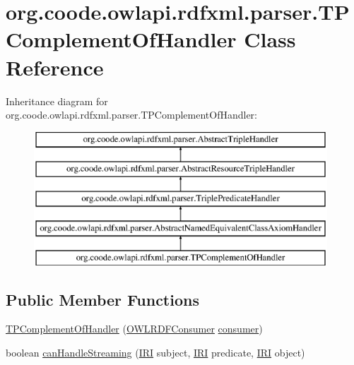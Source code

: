 \hypertarget{classorg_1_1coode_1_1owlapi_1_1rdfxml_1_1parser_1_1_t_p_complement_of_handler}{\section{org.\-coode.\-owlapi.\-rdfxml.\-parser.\-T\-P\-Complement\-Of\-Handler Class Reference}
\label{classorg_1_1coode_1_1owlapi_1_1rdfxml_1_1parser_1_1_t_p_complement_of_handler}
}
Inheritance diagram for org.\-coode.\-owlapi.\-rdfxml.\-parser.\-T\-P\-Complement\-Of\-Handler\-:\begin{figure}[H]
\begin{center}
\leavevmode
\includegraphics[height=5.000000cm]{classorg_1_1coode_1_1owlapi_1_1rdfxml_1_1parser_1_1_t_p_complement_of_handler}
\end{center}
\end{figure}
\subsection*{Public Member Functions}
\begin{DoxyCompactItemize}
\item 
\hyperlink{classorg_1_1coode_1_1owlapi_1_1rdfxml_1_1parser_1_1_t_p_complement_of_handler_a5de231a8898b0b4d8c3c7b3cff1c4178}{T\-P\-Complement\-Of\-Handler} (\hyperlink{classorg_1_1coode_1_1owlapi_1_1rdfxml_1_1parser_1_1_o_w_l_r_d_f_consumer}{O\-W\-L\-R\-D\-F\-Consumer} \hyperlink{classorg_1_1coode_1_1owlapi_1_1rdfxml_1_1parser_1_1_abstract_triple_handler_a4ccf4d898ff01eb1cadfa04b23d54e9c}{consumer})
\item 
boolean \hyperlink{classorg_1_1coode_1_1owlapi_1_1rdfxml_1_1parser_1_1_t_p_complement_of_handler_a2f7a9baf31de384368447839a39e6c10}{can\-Handle\-Streaming} (\hyperlink{classorg_1_1semanticweb_1_1owlapi_1_1model_1_1_i_r_i}{I\-R\-I} subject, \hyperlink{classorg_1_1semanticweb_1_1owlapi_1_1model_1_1_i_r_i}{I\-R\-I} predicate, \hyperlink{classorg_1_1semanticweb_1_1owlapi_1_1model_1_1_i_r_i}{I\-R\-I} object)
\end{DoxyCompactItemize}
